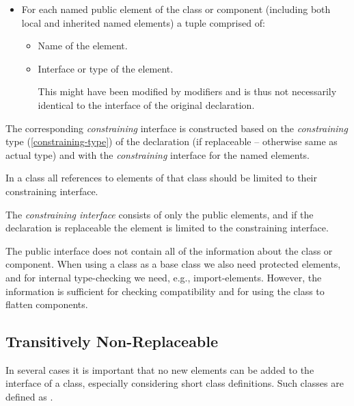 \begin{itemize}
  The following item does not apply for an \lstinline!operator record! class or class derived from \lstinline!ExternalObject!, since the type is already uniquely defined by the full name.
\item
  For each named public element of the class or component (including both local and inherited named elements) a tuple comprised of:
  \begin{itemize}
  \item
    Name of the element.
  \item
    Interface or type of the element.
    \begin{nonnormative}
    This might have been modified by modifiers and is thus not necessarily identical to the interface of the original declaration.
    \end{nonnormative}
  \end{itemize}
\end{itemize}

The corresponding \emph{constraining} interface is constructed based on the \emph{constraining} type (\cref{constraining-type}) of the declaration (if replaceable -- otherwise same as actual type) and with the \emph{constraining} interface for the named elements.

In a class all references to elements of that class should be limited to their constraining interface.

\begin{nonnormative}
The \emph{constraining interface} consists of only the public elements, and if the declaration is replaceable the element is limited to the constraining interface.
\end{nonnormative}

\begin{nonnormative}
The public interface does not contain all of the information about the class or component.
When using a class as a base class we also need protected elements, and for internal type-checking we need, e.g., import-elements.
However, the information is sufficient for checking compatibility and for using the class to flatten components.
\end{nonnormative}

\subsection{Transitively Non-Replaceable}\label{transitively-non-replaceable}

\begin{nonnormative}
In several cases it is important that no new elements can be added to the interface of a class, especially considering short class definitions.
Such classes are defined as .
\end{nonnormative}

